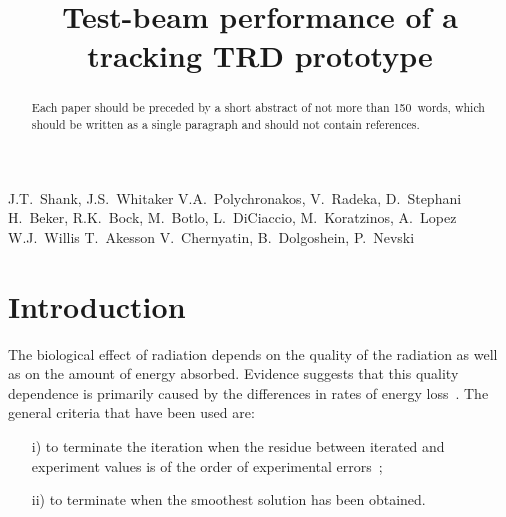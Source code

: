 \documentclass{cernphprep}
\begin{document}
\begin{titlepage}
\title{Test-beam performance of a tracking TRD prototype}

\begin{abstract}
Each paper should be preceded by a short abstract of not more 
than 150~words, which should be written as a single paragraph 
and should not contain references.
\end{abstract}

\vfill

\begin{Authlist}
J.T.~Shank, J.S.~Whitaker
V.A.~Polychronakos,  V.~Radeka,  D.~Stephani
H.~Beker,  R.K.~Bock,  M.~Botlo,  L.~DiCiaccio, 
M.~Koratzinos,  A.~Lopez\Aref{*}
W.J.~Willis
T.~Akesson
V.~Chernyatin,  B.~Dolgoshein,  P.~Nevski
\end{Authlist}
\vfill
{}
\end{titlepage}

\section{Introduction}

The biological effect of radiation depends on the quality of 
the radiation as well as on the amount of energy absorbed. Evidence 
suggests that this quality dependence is primarily caused by 
the differences in rates of energy loss~\cite{Raby1966,Dupont1961}. 
The general criteria that have been used are:

\begin{enumerate}
\item[i)]
      to terminate the iteration when the residue between iterated 
      and experiment values is of the order of experimental 
      errors~\cite{Raby1966,Appleman1959,vanBerg1965,Bryant1985,Allen1977};
\item[ii)]
      to terminate when the smoothest solution has been obtained.
\end{enumerate}
\end{document}
